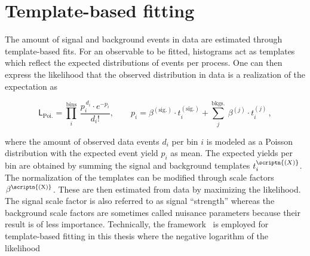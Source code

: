 

\section{Template-based fitting}
\label{sec:technique-fitting}

The amount of signal and background events in data are estimated through template-based  fits. For an observable to be fitted, histograms act as templates which reflect the expected distributions of events per process. One can then express the likelihood that the observed distribution in data is a realization of the  expectation as

\begin{equation}
\mathsf{L}_\mathrm{Poi.}=\prod_{i}^\mathrm{bins}~\frac{p_{i}^{\,d_{i}}\cdot e^{-p_{i}}}{d_{i}!},\qquad p_{i}=\beta^{\mathrm{(sig.)}}\cdot t^{\mathrm{(sig.)}}_{i}+\sum_{j}^\mathrm{bkgs.}~\beta^{(j)}\cdot t^{(j)}_{i} \,, \label{eq:technique-likelihood}
\end{equation}

where the amount of observed data events $d_{i}$ per bin $i$ is modeled as a Poisson distribution with the expected event yield $p_{i}$ as mean. The expected yields per bin are obtained by summing the signal and background templates $t^\scriptn{(X)}_{i}$. The normalization of the templates can be modified through scale factors $\beta^\scriptn{\mathrm{(X)}}$. These are then estimated from data by maximizing the likelihood. The signal scale factor is also referred to as signal ``strength'' whereas the background scale factors are sometimes called nuisance parameters because their result is of less importance. Technically, the \THETA[format=hyperbf] framework~\cite{theta} is employed for template-based fitting in this thesis where the negative logarithm of the likelihood

